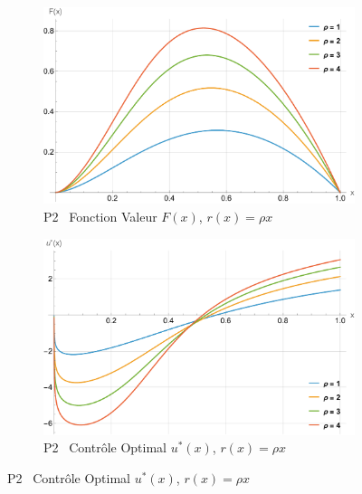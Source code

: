 \begin{figure}[htb]
    \centering
    \begin{subfigure}{0.45\linewidth}
        \includegraphics[width=\linewidth]{img/validation/P2/p2_R_value.pdf}
        \caption{P2 \textemdash~Fonction Valeur $F(x)$, $r(x)=\rho x$}\label{fig:RhoValueVisualisation2}
    \end{subfigure}
    \hfill
    \begin{subfigure}{0.45\linewidth}
        \includegraphics[width=\linewidth]{img/validation/P2/p2_R_control.pdf}
        \caption{P2 \textemdash~Contrôle Optimal $u^*(x)$, $r(x)=\rho x$}\label{fig:RhoControlVisualisation2}
    \end{subfigure}


\end{figure}
